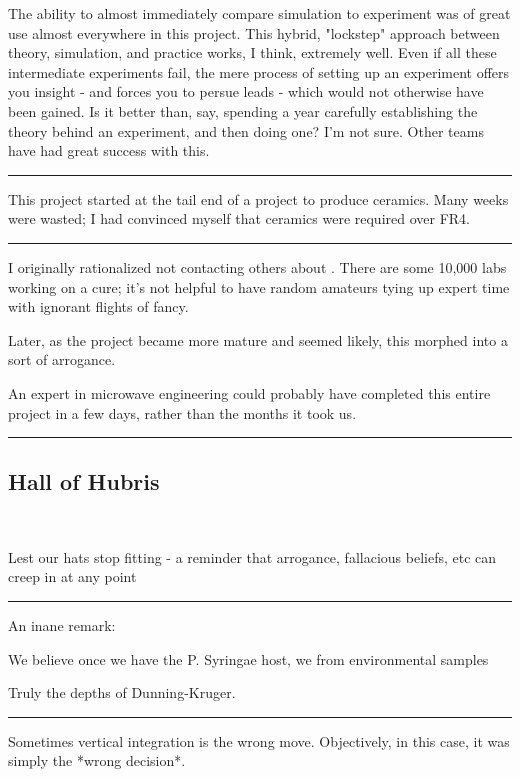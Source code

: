 \documentclass[paper.tex]{subfiles}
\begin{document}
The ability to almost immediately compare simulation to experiment was of great use almost everywhere in this project. This hybrid, "lockstep" approach between theory, simulation, and practice works, I think, extremely well. Even if all these intermediate experiments fail, the mere process of setting up an experiment offers you insight - and forces you to persue leads - which would not otherwise have been gained. Is it better than, say, spending a year carefully establishing the theory behind an experiment, and then doing one? I'm not sure. Other teams have had great success with this.

\rule{\linewidth}{0.2pt}

This project started at the tail end of a project to produce ceramics. Many weeks were wasted; I had convinced myself that ceramics were required over FR4. 

\rule{\linewidth}{0.2pt}

I originally rationalized not contacting others about . There are some 10,000 labs working on a cure; it's not helpful to have random amateurs tying up expert time with ignorant flights of fancy. 

Later, as the project became more mature and seemed likely, this morphed into a sort of arrogance.

An expert in microwave engineering could probably have completed this entire project in a few days, rather than the months it took us.

\rule{\linewidth}{0.2pt}

\subsection{Hall of Hubris} \

Lest our hats stop fitting - a reminder that arrogance, fallacious beliefs, etc can creep in at any point

\rule{\linewidth}{0.2pt}

An inane remark:

\begin{displayquote}
We believe once we have the P. Syringae host, we from environmental samples
\end{displayquote}

Truly the depths of Dunning-Kruger.




\rule{\linewidth}{0.2pt}

Sometimes vertical integration is the wrong move. Objectively, in this case, it was simply the *wrong decision*. 
\end{document}
